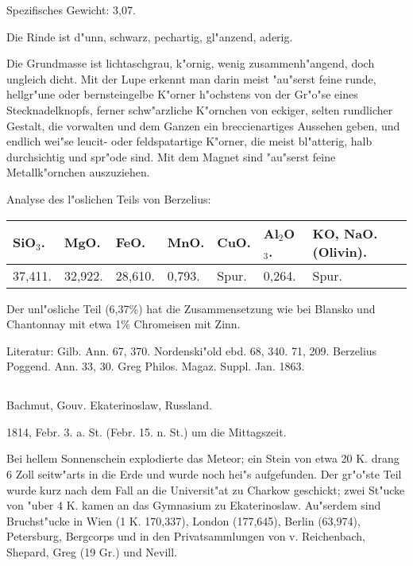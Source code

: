 \documentclass[a4paper, 11pt, oneside]{article}
\begin{document}
Spezifisches Gewicht: 3,07.

Die Rinde ist d"unn, schwarz, pechartig, gl"anzend, aderig.

Die Grundmasse ist lichtaschgrau, k"ornig, wenig zusammenh"angend, doch ungleich dicht. Mit der Lupe erkennt man darin meist "au"serst feine runde, hellgr"une oder bernsteingelbe K"orner h"ochstens von der Gr"o"se eines Stecknadelknopfs, ferner schw"arzliche K"ornchen von eckiger, selten rundlicher Gestalt, die vorwalten und dem Ganzen ein breccienartiges Aussehen geben, und endlich wei"se leucit- oder feldspatartige K"orner, die meist bl"atterig, halb durchsichtig und spr"ode sind. Mit dem Magnet sind "au"serst feine Metallk"ornchen auszuziehen.

Analyse des l"oslichen Teils von Berzelius:
\begin{table}[!ht]
    \centering\swabfamily\Large
    \begin{tabular}{l l l l l l l}
        SiO$_{3}$. & MgO. & FeO. & MnO. & CuO. & Al$_{2}$O$_{3}$. & KO, NaO. (Olivin). \\ \hline
        37,411. & 32,922. & 28,610. & 0,793. & Spur. & 0,264. & Spur. \\
    \end{tabular}
\end{table}

Der unl"osliche Teil (6,37\%) hat die Zusammensetzung wie bei Blansko und Chantonnay mit etwa 1\% Chromeisen mit Zinn.

\normalsize
Literatur: Gilb. Ann. 67, 370. Nordenski"old ebd. 68, 340. 71, 209. Berzelius Poggend. Ann. 33, 30. Greg Philos. Magaz. Suppl. Jan. 1863.
\subsection{}
\LARGE
\paragraph{}
Bachmut, Gouv. Ekaterinoslaw, Russland.

1814, Febr. 3. a. St. (Febr. 15. n. St.) um die Mittagszeit.

Bei hellem Sonnenschein explodierte das Meteor; ein Stein von etwa 20 K. drang 6 Zoll seitw"arts in die Erde und wurde noch hei"s aufgefunden. Der gr"o"ste Teil wurde kurz nach dem Fall an die Universit"at zu Charkow geschickt; zwei St"ucke von "uber 4 K. kamen an das Gymnasium zu Ekaterinoslaw. Au"serdem sind Bruchst"ucke in Wien (1 K. 170,337), London (177,645), Berlin (63,974), Petersburg, Bergcorps und in den Privatsammlungen von v. Reichenbach, Shepard, Greg (19 Gr.) und Nevill.
\end{document}
